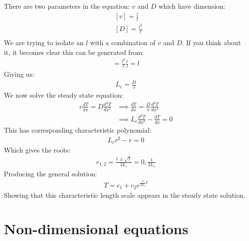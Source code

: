{\noindent There are two parameters in the equation: $v$ and $D$ which have dimension:
\begin{align*}
    &[v] = \frac{l}{t}\\
    &[D] = \frac{l^2}{t}\\
\end{align*}
We are trying to isolate an $l$ with a combination of $v$ and $D$. If you think about it, it becomes clear this can be generated from:
\begin{align*}
    [\frac{D}{v}] = \frac{l^2}{t}\frac{t}{l} = l
\end{align*}
Giving us:
\begin{align*}
    L_c = \frac{D}{v}
\end{align*}
We now solve the steady state equation:
\begin{align*}
    v \frac{d T}{d x} = D \frac{d^2 T}{d x^2} &\implies \frac{dT}{dx} = \frac{D}{v} \frac{d^2 T}{dx^2}\\
    &\implies L_c \frac{d^2 T}{dx^2} - \frac{dT}{dx} = 0
\end{align*}
This has corresponding characteristic polynomial:
\begin{align*}
    L_cr^2 - r = 0
\end{align*}
Which gives the roots:
\begin{align*}
r_{1,2}=\frac{1 \pm \sqrt{1}}{2L_c} = 0, \frac{1}{2 L_c}
\end{align*}
Producing the general solution:
\begin{align*}
    T = c_1 + c_2e^{\frac{1}{2 L_c} t}
\end{align*}
Showing that this characteristic length scale appears in the steady state solution.

}

\section{Non-dimensional equations}

